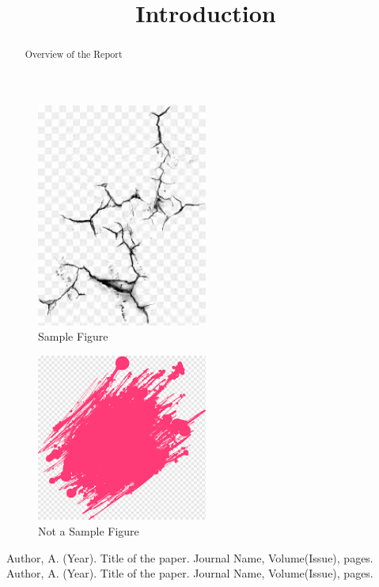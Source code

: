 \documentclass{article}
\begin{document}
\newpage
\title{Introduction}
\begin{abstract}
Overview of the Report
\end{abstract}
\begin{figure}[h!]
\centering
\includegraphics[width=0.5\textwidth]{figure1.png}
\caption{Sample Figure}
\end{figure}
\begin{figure}[h!]
\centering
\includegraphics[width=0.5\textwidth]{figure2.png}
\caption{Not a Sample Figure}
\end{figure}
\begin{thebibliography}{100}
Author, A. (Year). Title of the paper. Journal Name, Volume(Issue), pages.
Author, A. (Year). Title of the paper. Journal Name, Volume(Issue), pages.
\end{thebibliography}
\end{document}
